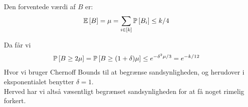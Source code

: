 Den forventede værdi af $B$ er:
$$
  \E{B} = \mu = \sum_{i \in [k]} \P{B_i} \leq k/4
$$

Da får vi
\begin{align*}
  \P{B \geq 2 \mu}
  = \P{B \geq (1 + \delta) \mu }
  \leq e^{- \delta^2 \mu / 3}
  = e^{- k / 12}
\end{align*}
Hvor vi bruger Chernoff Bounds til at begrænse sandsynligheden, og herudover i eksponentialet benytter $\delta = 1$.\\

Herved har vi altså væsentligt begrænset sandsynligheden for at få noget rimelig forkert.










